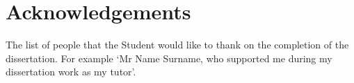 
\chapter*{\centering Acknowledgements}
\begin{spacing}{1.5}
\setlength{\parskip}{0.3in}

The list of people that the Student would like to thank on the completion of the dissertation. For example ‘Mr Name Surname, who supported me during my dissertation work as my tutor’.

\end{spacing}
\newpage
